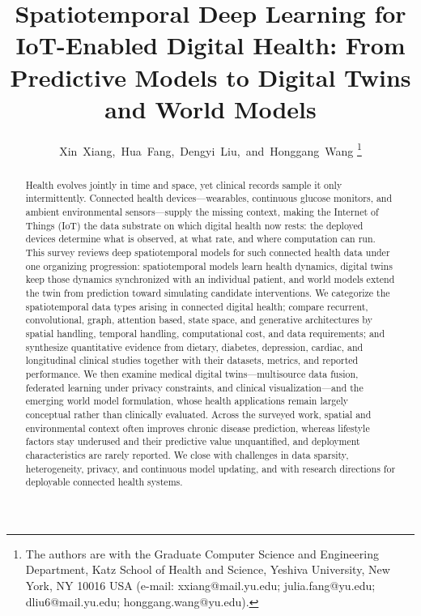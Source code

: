 \documentclass[journal]{IEEEtran}
\begin{document}
\title{Spatiotemporal Deep Learning for IoT-Enabled Digital Health: From Predictive Models to Digital Twins and World Models}

\author{Xin~Xiang,~Hua~Fang,~Dengyi~Liu,~and~Honggang~Wang%
\thanks{The authors are with the Graduate Computer Science and Engineering Department, Katz School of Health and Science, Yeshiva University, New York, NY 10016 USA (e-mail: xxiang@mail.yu.edu; julia.fang@yu.edu; dliu6@mail.yu.edu; honggang.wang@yu.edu).}}

\maketitle

\begin{abstract}
Health evolves jointly in time and space, yet clinical records sample it only intermittently. Connected health devices---wearables, continuous glucose monitors, and ambient environmental sensors---supply the missing context, making the Internet of Things (IoT) the data substrate on which digital health now rests: the deployed devices determine what is observed, at what rate, and where computation can run. This survey reviews deep spatiotemporal models for such connected health data under one organizing progression: spatiotemporal models learn health dynamics, digital twins keep those dynamics synchronized with an individual patient, and world models extend the twin from prediction toward simulating candidate interventions. We categorize the spatiotemporal data types arising in connected digital health; compare recurrent, convolutional, graph, attention based, state space, and generative architectures by spatial handling, temporal handling, computational cost, and data requirements; and synthesize quantitative evidence from dietary, diabetes, depression, cardiac, and longitudinal clinical studies together with their datasets, metrics, and reported performance. We then examine medical digital twins---multisource data fusion, federated learning under privacy constraints, and clinical visualization---and the emerging world model formulation, whose health applications remain largely conceptual rather than clinically evaluated. Across the surveyed work, spatial and environmental context often improves chronic disease prediction, whereas lifestyle factors stay underused and their predictive value unquantified, and deployment characteristics are rarely reported. We close with challenges in data sparsity, heterogeneity, privacy, and continuous model updating, and with research directions for deployable connected health systems.
\end{abstract}
\end{document}
